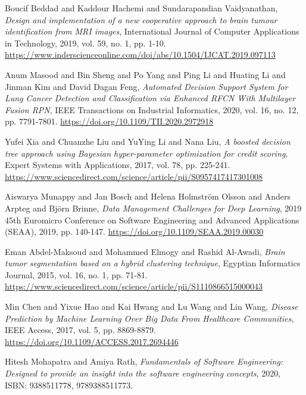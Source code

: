 \documentclass[conference]{IEEEtran}
\begin{document}
\begin{thebibliography}{00}
Boucif Beddad and Kaddour Hachemi and Sundarapandian Vaidyanathan,
\emph{Design and implementation of a new cooperative approach to brain tumour identification from MRI images},
International Journal of Computer Applications in Technology,
2019,
vol. 59, no. 1, pp. 1-10.
\url{https://www.inderscienceonline.com/doi/abs/10.1504/IJCAT.2019.097113}

Anum Masood and Bin Sheng and Po Yang and Ping Li and Huating Li and Jinman Kim and David Dagan Feng,
\emph{Automated Decision Support System for Lung Cancer Detection and Classification via Enhanced RFCN With Multilayer Fusion RPN},
IEEE Transactions on Industrial Informatics,
2020,
vol. 16, no. 12, pp. 7791-7801.
\url{https://doi.org/10.1109/TII.2020.2972918}

Yufei Xia and Chuanzhe Liu and YuYing Li and Nana Liu,
\emph{A boosted decision tree approach using Bayesian hyper-parameter optimization for credit scoring},
Expert Systems with Applications,
2017,
vol. 78, pp. 225-241.
\url{https://www.sciencedirect.com/science/article/pii/S0957417417301008}

Aiswarya Munappy and Jan Bosch and Helena Holmström Olsson and Anders Arpteg and Björn Brinne,
\emph{Data Management Challenges for Deep Learning},
2019 45th Euromicro Conference on Software Engineering and Advanced Applications (SEAA),
2019,
pp. 140-147.
\url{https://doi.org/10.1109/SEAA.2019.00030}

Eman Abdel-Maksoud and Mohammed Elmogy and Rashid Al-Awadi,
\emph{Brain tumor segmentation based on a hybrid clustering technique},
Egyptian Informatics Journal,
2015,
vol. 16, no. 1, pp. 71-81.
\url{https://www.sciencedirect.com/science/article/pii/S1110866515000043}

Min Chen and Yixue Hao and Kai Hwang and Lu Wang and Lin Wang,
\emph{Disease Prediction by Machine Learning Over Big Data From Healthcare Communities},
IEEE Access,
2017,
vol. 5, pp. 8869-8879.
\url{https://doi.org/10.1109/ACCESS.2017.2694446}

Hitesh Mohapatra and Amiya Rath,
\emph{Fundamentals of Software Engineering: Designed to provide an insight into the software engineering concepts},
2020,
ISBN: 9388511778, 9789388511773.

\end{thebibliography}
\end{document}
